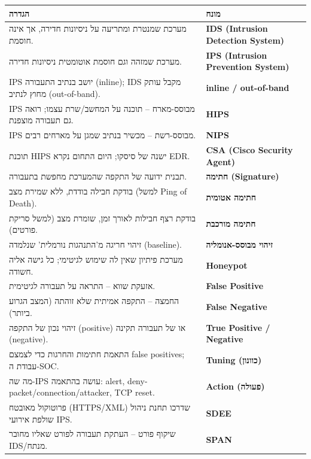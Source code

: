 \documentclass[11pt]{article}
\newcommand{\enLR}[1]{\textenglish{#1}}
\begin{document}
\begin{xltabular}{\linewidth}{|>{\setRTL\raggedleft\arraybackslash}X|>{\setRTL\raggedleft\arraybackslash}X|}
\hline
{}\textbf{הגדרה} & \textbf{מונח} \\
\hline
\endhead
מערכת שמנטרת ומתריעה על ניסיונות חדירה, אך אינה חוסמת. & \textbf{\enLR{IDS (Intrusion Detection System)}} \\
\hline
מערכת שמזהה וגם חוסמת אוטומטית ניסיונות חדירה. & \textbf{\enLR{IPS (Intrusion Prevention System)}} \\
\hline
\enLR{IPS} יושב בנתיב התעבורה \enLR{(inline); IDS} מקבל עותק מחוץ לנתיב \enLR{(out-of-band).} & \textbf{\enLR{inline / out-of-band}} \\
\hline
\enLR{IPS} מבוסס-מארח – תוכנה על המחשב/שרת עצמו; רואה גם תעבורה מוצפנת. & \textbf{\enLR{HIPS}} \\
\hline
\enLR{IPS} מבוסס-רשת – מכשיר בנתיב שמגן על מארחים רבים. & \textbf{\enLR{NIPS}} \\
\hline
תוכנת \enLR{HIPS} ישנה של סיסקו; היום התחום נקרא \enLR{EDR.} & \textbf{\enLR{CSA (Cisco Security Agent)}} \\
\hline
תבנית ידועה של התקפה שהמערכת מחפשת בתעבורה. & \textbf{חתימה \enLR{(Signature)}} \\
\hline
בודקת חבילה בודדת, ללא שמירת מצב (למשל \enLR{Ping of Death).} & \textbf{חתימה אטומית} \\
\hline
בודקת רצף חבילות לאורך זמן, שומרת מצב (למשל סריקת פורטים). & \textbf{חתימה מורכבת} \\
\hline
זיהוי חריגה מ'התנהגות נורמלית' שנלמדה \enLR{(baseline).} & \textbf{זיהוי מבוסס-אנומליה} \\
\hline
מערכת פיתיון שאין לה שימוש לגיטימי; כל גישה אליה חשודה. & \textbf{\enLR{Honeypot}} \\
\hline
אזעקת שווא – התראה על תעבורה לגיטימית. & \textbf{\enLR{False Positive}} \\
\hline
החמצה – התקפה אמיתית שלא זוהתה (המצב הגרוע ביותר). & \textbf{\enLR{False Negative}} \\
\hline
זיהוי נכון של התקפה \enLR{(positive)} או של תעבורה תקינה \enLR{(negative).} & \textbf{\enLR{True Positive / Negative}} \\
\hline
התאמת חתימות והחרגות כדי לצמצם \enLR{false positives}; עבודת ה-\enLR{SOC.} & \textbf{\enLR{Tuning} (כוונון)} \\
\hline
מה שה-\enLR{IPS} עושה בהתאמה: \enLR{alert, deny-packet/connection/attacker, TCP reset.} & \textbf{\enLR{Action} (פעולה)} \\
\hline
פרוטוקול מאובטח \enLR{(HTTPS/XML)} שדרכו תחנת ניהול שולפת אירועי \enLR{IPS.} & \textbf{\enLR{SDEE}} \\
\hline
שיקוף פורט – העתקת תעבורה לפורט שאליו מחובר \enLR{IDS}/מנתח. & \textbf{\enLR{SPAN}} \\
\hline
\end{xltabular}
\end{document}
